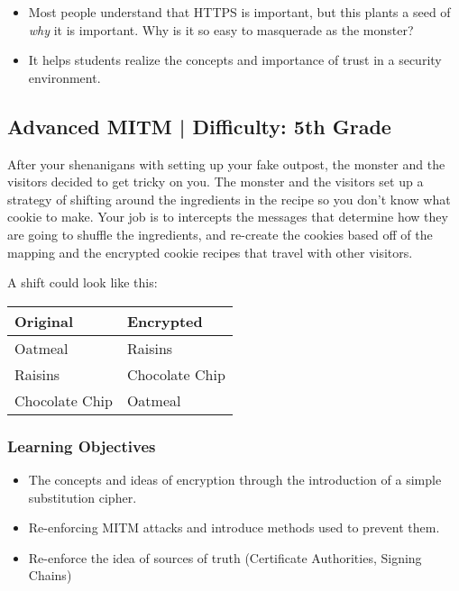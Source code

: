 \documentclass{article}
\begin{document}
\begin{itemize}
  \item Most people understand that HTTPS is important, but this
    plants a seed of \textit{why} it is important. Why is it so easy to
    masquerade as the monster? 
  \item It helps students realize the concepts and importance of trust in a
    security environment. 
\end{itemize}

\subsection{Advanced MITM | Difficulty: 5th Grade}

After your shenanigans with setting up your fake outpost, the monster
and the visitors decided to get tricky on you. The monster and the
visitors set up a strategy of shifting around the ingredients in the
recipe so you don't know what cookie to make. Your job is to
intercepts the messages that determine how they are going to shuffle
the ingredients, and re-create the cookies based off of the mapping and
the encrypted cookie recipes that travel with other visitors.

A shift could look like
this: %
\begin{table}[h]
\centering
\begin{tabular}{l|l}
\textbf{Original}       & \textbf{Encrypted}      \\ \hline
Oatmeal        & Raisins        \\ \hline
Raisins        & Chocolate Chip \\ \hline
Chocolate Chip & Oatmeal        \\
\end{tabular}
\end{table}

\subsubsection{Learning Objectives}

\begin{itemize}
  \item The concepts and ideas of encryption through the introduction of a simple
  substitution cipher.
  \item Re-enforcing MITM attacks and introduce  methods used to prevent them.
  \item Re-enforce the idea of sources of truth (Certificate
    Authorities, Signing Chains)
\end{itemize}
\end{document}
